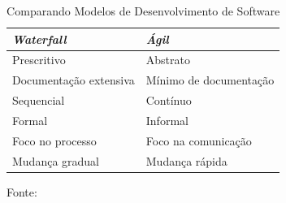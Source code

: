 \begin{table}[ht]
	\caption{Comparando Modelos de Desenvolvimento de Software}
	\label{waterfall_x_agil}
	\ABNTEXfontereduzida
	\begin{tabular}{p{8cm}p{8cm}}
	\toprule
	\textit{Waterfall} & \textit{Ágil}\\
	\midrule
	\ABNTEXfontereduzida
	Prescritivo & Abstrato\\
	Documentação extensiva & Mínimo de documentação\\
	Sequencial & Contínuo\\
	Formal & Informal\\
	Foco no processo & Foco na comunicação\\
	Mudança gradual & Mudança rápida\\
	\bottomrule
	\end{tabular}
	\footnotesize Fonte:
	\cite{KristinRunyan2014}
\end{table}


